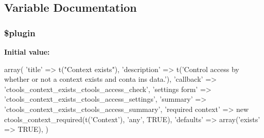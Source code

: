 \subsection{Variable Documentation}
\hypertarget{context__exists_8inc_ada8a7130088351710bb02ed622d6bf65}{
\subsubsection[{\$plugin}]{\setlength{\rightskip}{0pt plus 5cm}\$plugin}}
\label{context__exists_8inc_ada8a7130088351710bb02ed622d6bf65}
{\bfseries Initial value:}
\begin{DoxyCode}
 array(
  'title' => t("Context exists"),
  'description' => t('Control access by whether or not a context exists and conta
      ins data.'),
  'callback' => 'ctools_context_exists_ctools_access_check',
  'settings form' => 'ctools_context_exists_ctools_access_settings',
  'summary' => 'ctools_context_exists_ctools_access_summary',
  'required context' => new ctools_context_required(t('Context'), 'any', TRUE),
  'defaults' => array('exists' => TRUE),
)
\end{DoxyCode}
